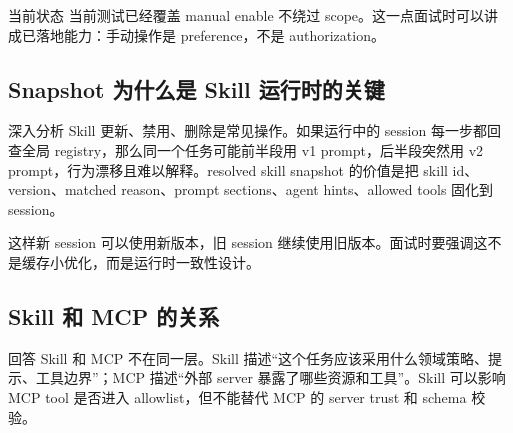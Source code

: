 \begin{qaBox}{当前状态}
当前测试已经覆盖 manual enable 不绕过 scope。这一点面试时可以讲成已落地能力：手动操作是 preference，不是 authorization。
\end{qaBox}

\subsection{Snapshot 为什么是 Skill 运行时的关键}
\begin{analysisBox}{深入分析}
Skill 更新、禁用、删除是常见操作。如果运行中的 session 每一步都回查全局 registry，那么同一个任务可能前半段用 v1 prompt，后半段突然用 v2 prompt，行为漂移且难以解释。resolved skill snapshot 的价值是把 skill id、version、matched reason、prompt sections、agent hints、allowed tools 固化到 session。

这样新 session 可以使用新版本，旧 session 继续使用旧版本。面试时要强调这不是缓存小优化，而是运行时一致性设计。
\end{analysisBox}

\subsection{Skill 和 MCP 的关系}
\begin{qaBox}{回答}
Skill 和 MCP 不在同一层。Skill 描述“这个任务应该采用什么领域策略、提示、工具边界”；MCP 描述“外部 server 暴露了哪些资源和工具”。Skill 可以影响 MCP tool 是否进入 allowlist，但不能替代 MCP 的 server trust 和 schema 校验。
\end{qaBox}

